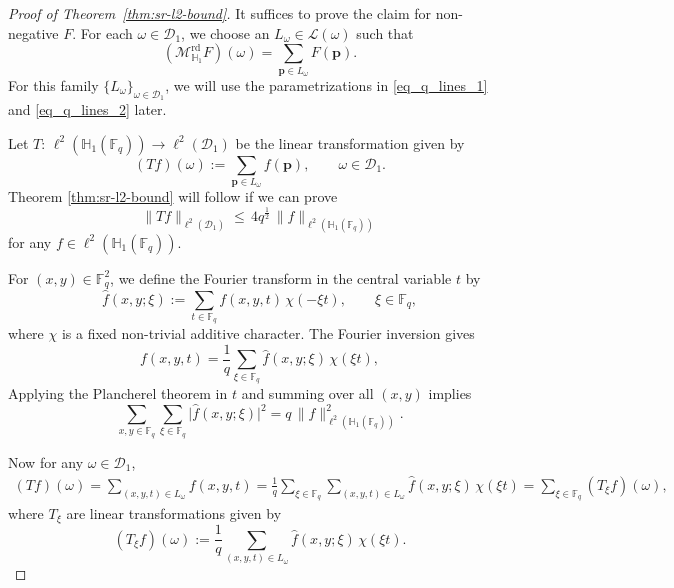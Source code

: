 \documentclass[11pt]{article}
\newcommand{\cD}{\mathcal{D}}
\newcommand{\cL}{\mathcal{L}}
\newcommand{\1}{\mathbf 1}
\newcommand{\Fq}{\mathbb{F}_q}
\begin{document}
\begin{proof}[Proof of Theorem~\ref{thm:sr-l2-bound}]

It suffices to prove the claim for non-negative $F$. For each $\omega\in\mathcal D_1$, we choose an $L_\omega\in \cL(\omega)$ such that 
\[
(\mathcal{M}^{\mathrm{rd}}_{\mathbb H_1}F)(\omega)
=
\sum_{\mathbf p\in L_\omega}F(\mathbf p).
\]
For this family $\{L_\omega\}_{\omega\in \cD_1}$, we will use the parametrizations in \eqref{eq_q_lines_1} and \eqref{eq_q_lines_2} later. 

Let $T:\, \ell^2(\mathbb H_1(\Fq))\rightarrow \ell^2(\cD_1)$ be the linear transformation given by 
\[
(Tf)(\omega):=\sum_{\mathbf p\in L_\omega} f(\mathbf p),
\qquad \omega\in\mathcal D_1.
\]
Theorem \ref{thm:sr-l2-bound} will follow if we can prove 
\begin{equation} \label{eq_aim_thm1.7}
\|Tf\|_{\ell^2(\mathcal D_1)}
\leq \, 4q^{\frac{1}{2}}\,\|f\|_{\ell^2(\mathbb H_1(\mathbb F_q))}
\end{equation}
for any $f\in \ell^2(\mathbb H_1(\Fq))$. 

For $(x,y)\in \Fq^2$, we define the Fourier transform in the central variable $t$ by
\[
\widehat f(x,y;\xi):=\sum_{t\in\mathbb F_q} f(x,y,t)\,\chi(-\xi t),
\qquad \xi\in\mathbb F_q,
\]
where $\chi$ is a fixed non-trivial additive character. The Fourier inversion gives
\[
f(x,y,t)=\frac1q\sum_{\xi\in\mathbb F_q}\widehat f(x,y;\xi)\,\chi(\xi t),
\]
Applying the Plancherel theorem in $t$ and summing over all $(x,y)$ implies
\begin{equation} \label{eq_Plancerel_central}
\sum_{x,y\in\mathbb F_q}\sum_{\xi\in\mathbb F_q}
\bigl|\widehat f(x,y;\xi)\bigr|^2
=
q\,\|f\|_{\ell^2(\mathbb H_1(\mathbb F_q))}^2.
\end{equation}


Now for any $\omega\in \cD_1$, 
\begin{align*}
(Tf)(\omega)
=\sum_{(x,y,t)\in L_\omega} f(x,y,t)=\frac1q\sum_{\xi\in\mathbb F_q}\sum_{(x,y,t)\in L_\omega}
\widehat f(x,y;\xi)\,\chi(\xi t)=\sum\limits_{\xi\in \Fq} (T_\xi f)(\omega),
\end{align*}
where $T_\xi$ are linear transformations given by 
\begin{equation} \label{eq_T_xi}
(T_\xi f)(\omega)
:=
\frac1q\sum_{(x,y,t)\in L_\omega}
\widehat f(x,y;\xi)\,\chi(\xi t).
\end{equation}


\end{proof}
\end{document}
